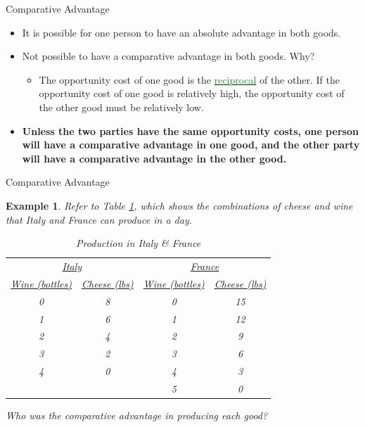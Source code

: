 \documentclass[xcolor={dvipsnames},pdf, hyperref={colorlinks=true, citecolor=ForestGreen, linkcolor=BlueViolet, urlcolor=Magenta}]{beamer}
\newtheorem{exmp}{Example}[section]
\theoremstyle{definition}
\newcommand{\ddp}[1]{{\textcolor{ForestGreen}{#1}}}
\newcommand{\dd}[1]{{\underline{\textcolor{ForestGreen}{#1}}}}
\begin{document}
\begin{frame}{Comparative Advantage}
	\begin{itemize}
		\item 	It is possible for one person to have an absolute advantage in both goods. 
		\item Not possible to have a comparative advantage in both goods. Why? 
			\begin{itemize}
				\item The opportunity cost of one good is the \dd{reciprocal} of the other. If the opportunity cost of one good is relatively high, the opportunity cost of the other good must be relatively low.
			\end{itemize} 
	\item	\textbf{Unless the two parties have the same opportunity costs, one person will have a comparative advantage in one good, and the other party will have a comparative advantage in the other good.}
	\end{itemize}
\end{frame}
	
		\begin{frame}[t]{Comparative Advantage}
			
			\begin{exmp}
				\scriptsize
			Refer to Table \ref{tab1}, which shows the combinations of cheese and wine that Italy and France can produce in a day.
			\begin{table}[H]
				\caption{Production in Italy \& France}
				\label{tab1}
				\centering
				\begin{tabular}{ cccc} 
					
					\multicolumn{2}{c}{\underline{Italy}} &  \multicolumn{2}{c}{\underline{France}}  \\
					\underline{Wine (bottles)} & \underline{Cheese (lbs)}  & \underline{Wine (bottles)} & \underline{Cheese (lbs)}  \\
				
					0 & 8 & 0 & 15 \\
					1 & 6 & 1 & 12 \\
					2 & 4 & 2 & 9\\
					3 & 2 & 3 & 6 \\
					4 & 0 & 4 & 3 \\
					&& 5 & 0 \\
				\end{tabular}
			\end{table}	
			Who was the comparative advantage in producing each good?
			\end{exmp}
		\scriptsize
	\pause	\ddp{Italy: 1 bottle wine: 2 lbs cheese. France: 1 bottle wine: 3 lbs cheese $\Rightarrow$ Italy has CA in producing wine. France has CA in producing cheese.}	
		\end{frame}
	
\end{document}
